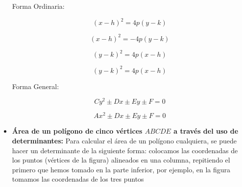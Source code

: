 \documentclass[letterpaper, 12pt]{article}
\begin{document}
\begin{itemize}
        Forma Ordinaria: 
        
            \begin{equation*}
                (x-h)^{2} = 4p(y-k)
            \end{equation*}
            
            \begin{equation*}
                (x-h)^{2} = -4p(y-k)
            \end{equation*}
            
            \begin{equation*}
                (y-k)^{2} = 4p(x-h)
            \end{equation*}
            
            \begin{equation*}
                (y-k)^{2} = 4p(x-h)
            \end{equation*}
            
        Forma General:
        
            \begin{equation*}
                Cy^{2} \pm Dx \pm Ey \pm F = 0
            \end{equation*}
            
            \begin{equation*}
                Ax^{2} \pm Dx \pm Ey \pm F = 0
            \end{equation*}
            
        \item \textbf{Área de un polígono de cinco vértices $ABCDE$ a través del uso de determinantes:} Para calcular el área de un polígono cualquiera, se puede hacer un determinante de la siguiente forma: colocamos las coordenadas de los puntos (vértices de la figura) alineados en una columna, repitiendo el primero que hemos tomado en la parte inferior, por ejemplo, en la figura tomamos las coordenadas de los tres puntos\\
        

\end{itemize}
\end{document}
